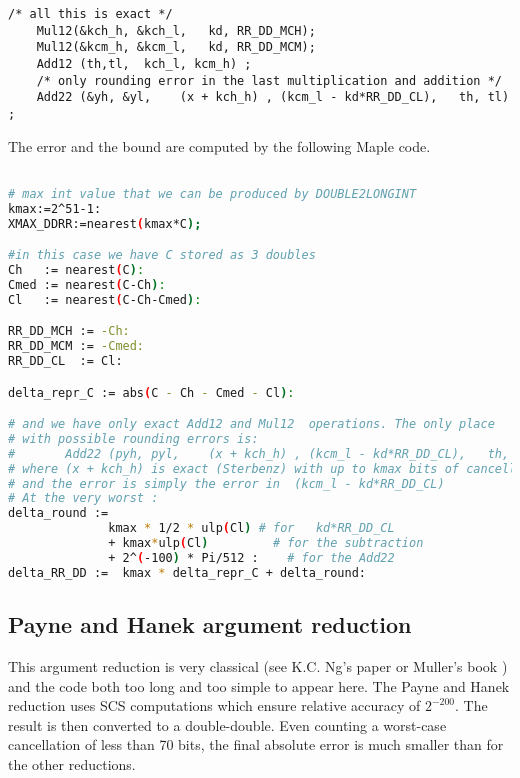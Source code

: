 \begin{lstlisting}[caption={Cody and Waite argument reduction in
    double-double},firstnumber=57]
    /* all this is exact */
    Mul12(&kch_h, &kch_l,   kd, RR_DD_MCH);
    Mul12(&kcm_h, &kcm_l,   kd, RR_DD_MCM);
    Add12 (th,tl,  kch_l, kcm_h) ;
    /* only rounding error in the last multiplication and addition */ 
    Add22 (&yh, &yl,    (x + kch_h) , (kcm_l - kd*RR_DD_CL),   th, tl) ;
\end{lstlisting}


The error and the bound are computed by the following Maple code.

\begin{lstlisting}[caption={Maple script for computing constants for Cody and Waite
    double-double\label{trigo:lst:cwddrmaple}}, firstnumber=1,
  language={sh}, numbers=none]% of course it's maple
%Skip a line here, I don't know why, otherwise latex eats the first line

# max int value that we can be produced by DOUBLE2LONGINT
kmax:=2^51-1:
XMAX_DDRR:=nearest(kmax*C);

#in this case we have C stored as 3 doubles
Ch   := nearest(C):
Cmed := nearest(C-Ch):
Cl   := nearest(C-Ch-Cmed):

RR_DD_MCH := -Ch:
RR_DD_MCM := -Cmed:
RR_DD_CL  := Cl:

delta_repr_C := abs(C - Ch - Cmed - Cl):

# and we have only exact Add12 and Mul12  operations. The only place
# with possible rounding errors is:
#       Add22 (pyh, pyl,    (x + kch_h) , (kcm_l - kd*RR_DD_CL),   th, tl) ;
# where (x + kch_h) is exact (Sterbenz) with up to kmax bits of cancellation
# and the error is simply the error in  (kcm_l - kd*RR_DD_CL)
# At the very worst :
delta_round :=
              kmax * 1/2 * ulp(Cl) # for   kd*RR_DD_CL
              + kmax*ulp(Cl)         # for the subtraction
              + 2^(-100) * Pi/512 :    # for the Add22
delta_RR_DD :=  kmax * delta_repr_C + delta_round:
\end{lstlisting}


\subsection{Payne and Hanek argument reduction }

This argument reduction is very classical (see K.C. Ng's
paper\cite{Ng1992} or Muller's book \cite{Muller97}) and the code both
too long and too simple to appear here. The Payne and Hanek reduction
uses SCS computations which ensure relative accuracy of $2^{-200}$.
The result is then converted to a double-double.  Even counting a
worst-case cancellation of less than 70 bits, the final absolute error
is much smaller than for the other reductions.

